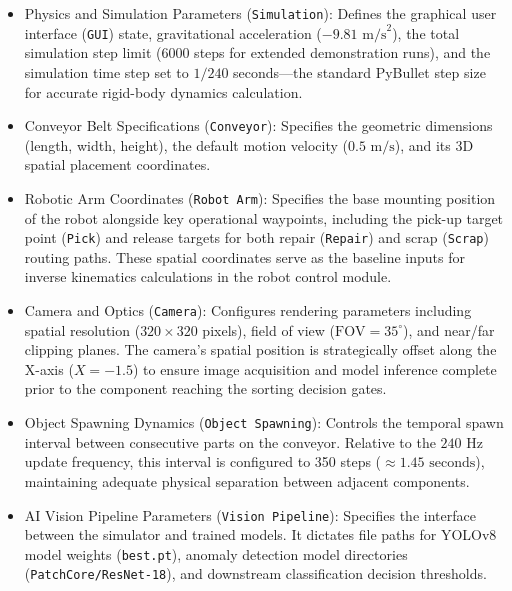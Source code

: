 \documentclass{article}
\begin{document}
\begin{itemize}
	\item Physics and Simulation Parameters (\texttt{Simulation}): Defines the graphical user interface (\texttt{GUI}) state, gravitational acceleration ($-9.81 \text{ m/s}^2$), the total simulation step limit (6000 steps for extended demonstration runs), and the simulation time step set to $1/240$ seconds—the standard PyBullet step size for accurate rigid-body dynamics calculation.
	
	\item Conveyor Belt Specifications (\texttt{Conveyor}): Specifies the geometric dimensions (length, width, height), the default motion velocity ($0.5 \text{ m/s}$), and its 3D spatial placement coordinates.
	
	\item Robotic Arm Coordinates (\texttt{Robot Arm}): Specifies the base mounting position of the robot alongside key operational waypoints, including the pick-up target point (\texttt{Pick}) and release targets for both repair (\texttt{Repair}) and scrap (\texttt{Scrap}) routing paths. These spatial coordinates serve as the baseline inputs for inverse kinematics calculations in the robot control module.
	
	\item Camera and Optics (\texttt{Camera}): Configures rendering parameters including spatial resolution ($320 \times 320$ pixels), field of view ($\text{FOV} = 35^\circ$), and near/far clipping planes. The camera's spatial position is strategically offset along the X-axis ($X = -1.5$) to ensure image acquisition and model inference complete prior to the component reaching the sorting decision gates.
	
	\item Object Spawning Dynamics (\texttt{Object Spawning}): Controls the temporal spawn interval between consecutive parts on the conveyor. Relative to the $240 \text{ Hz}$ update frequency, this interval is configured to 350 steps ($\approx 1.45 \text{ seconds}$), maintaining adequate physical separation between adjacent components.
	
	\item AI Vision Pipeline Parameters (\texttt{Vision Pipeline}): Specifies the interface between the simulator and trained models. It dictates file paths for YOLOv8 model weights (\texttt{best.pt}), anomaly detection model directories (\texttt{PatchCore/ResNet-18}), and downstream classification decision thresholds.
\end{itemize}
\end{document}
